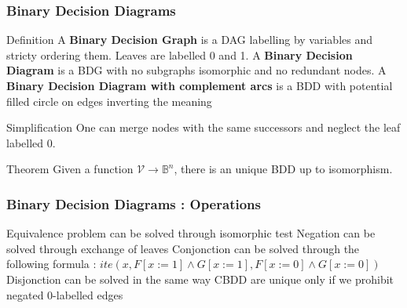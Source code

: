 \documentclass[pdf]{beamer}
\newcommand{\bb}[1]{\mathbb{#1}}
\newcommand{\V}{\mathcal{V}}
\begin{document}
\begin{frame}
\frametitle{Binary Decision Diagrams}
\begin{block}{Definition}
A \textbf{Binary Decision Graph} is a DAG labelling by variables and stricty ordering them. Leaves are labelled 0 and 1.\newline
A \textbf{Binary Decision Diagram} is a BDG with no subgraphs isomorphic and no redundant nodes.\newline
A \textbf{Binary Decision Diagram with complement arcs} is a BDD with potential filled circle on edges inverting the meaning\newline
\end{block}

\begin{exampleblock}{Simplification}
One can merge nodes with the same successors and neglect the leaf labelled 0.
\end{exampleblock}

\begin{alertblock}{Theorem}
Given a function $\V \rightarrow \bb{B}^n$, there is an unique BDD up to isomorphism. \newline
\end{alertblock}

\end{frame}

\begin{frame}
\frametitle{Binary Decision Diagrams : Operations}

\begin{alertblock}
Equivalence problem can be solved through isomorphic test \newline
Negation can be solved through exchange of leaves \newline
Conjonction can be solved through the following formula : \newline
$ite(x,F[x:=1]\wedge G[x:=1],F[x:=0]\wedge G[x:=0])$ \newline
Disjonction can be solved in the same way \newline
CBDD are unique only if we prohibit negated 0-labelled edges\newline
\end{alertblock}

\end{frame}
\end{document}
